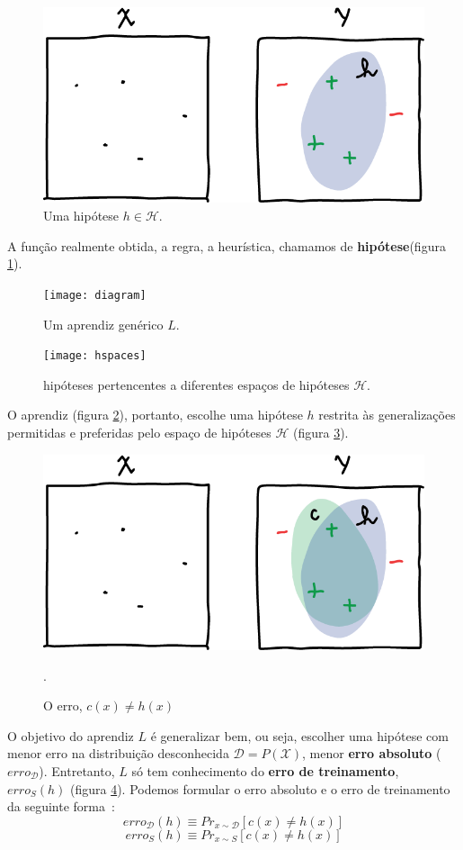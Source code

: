 \documentclass[
10pt, %
a4paper, %
onecolumn, %
]{article}
\begin{document}
\begin{figure}[!htp]
    \centering
    \includegraphics[width=.5\textwidth]{hypothesis}
    \caption{Uma hipótese $h \in \mathcal{H}$.}
    \label{fig:hypothesis}
\end{figure}


A função realmente obtida, a regra, a heurística, chamamos de \textbf{hipótese}(figura \ref{fig:hypothesis}). 

\begin{figure}[!htp]
    \centering
    \texttt{[image: diagram]}
    \caption{Um aprendiz genérico $L$.}
    \label{fig:diagram}
  \end{figure}


  \begin{figure}[!htp]
      \centering
      \texttt{[image: hspaces]}
      \caption{hipóteses pertencentes a diferentes espaços de hipóteses $\mathcal{H}$.}
      \label{fig:hspaces}
  \end{figure}
O aprendiz (figura \ref{fig:diagram}), portanto, escolhe uma hipótese $h$
restrita às generalizações permitidas e preferidas pelo espaço de hipóteses $\mathcal{H}$ (figura \ref{fig:hspaces}).
\begin{figure}[!htp]
    \centering
    \includegraphics[width=.5\textwidth]{conceptVShypothesis}
    \caption{O erro, $c(x)\neq h(x)$} .
    \label{fig:erros}
\end{figure}
O objetivo do aprendiz $L$ é generalizar bem, ou seja,  escolher uma hipótese com menor erro na distribuição desconhecida $\mathcal{D}=P(\mathcal{X})$, menor \textbf{erro absoluto} ($erro_{\mathcal{D}}$). Entretanto, $L$ só tem conhecimento do \textbf{erro de treinamento}, $erro_{S}(h)$ (figura \ref{fig:erros}). Podemos formular o erro absoluto e o erro de treinamento da seguinte forma~\cite{MitchelPAC}:
\begin{equation}
    erro_{\mathcal{D}}(h) \equiv Pr_{x \sim \mathcal{D}}[c(x) \neq h(x)]
\end{equation}
\begin{equation}
  erro_{S}(h) \equiv Pr_{x \sim S}[c(x) \neq h(x)]
\end{equation}
\end{document}
